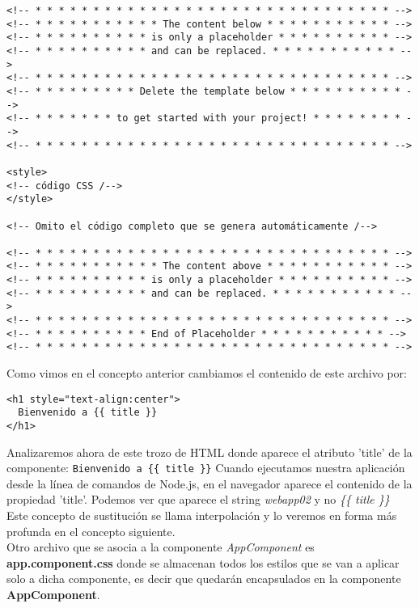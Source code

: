 \documentclass[12pt]{book} %
\begin{document}
\begin{verbatim}
<!-- * * * * * * * * * * * * * * * * * * * * * * * * * * * * * * * -->
<!-- * * * * * * * * * * * The content below * * * * * * * * * * * -->
<!-- * * * * * * * * * * is only a placeholder * * * * * * * * * * -->
<!-- * * * * * * * * * * and can be replaced. * * * * * * * * * * * -->
<!-- * * * * * * * * * * * * * * * * * * * * * * * * * * * * * * * -->
<!-- * * * * * * * * * Delete the template below * * * * * * * * * * -->
<!-- * * * * * * * to get started with your project! * * * * * * * * -->
<!-- * * * * * * * * * * * * * * * * * * * * * * * * * * * * * * * -->

<style>
<!-- código CSS /-->
</style>

<!-- Omito el código completo que se genera automáticamente /-->

<!-- * * * * * * * * * * * * * * * * * * * * * * * * * * * * * * * -->
<!-- * * * * * * * * * * * The content above * * * * * * * * * * * -->
<!-- * * * * * * * * * * is only a placeholder * * * * * * * * * * -->
<!-- * * * * * * * * * * and can be replaced. * * * * * * * * * * * -->
<!-- * * * * * * * * * * * * * * * * * * * * * * * * * * * * * * * -->
<!-- * * * * * * * * * * End of Placeholder * * * * * * * * * * * -->
<!-- * * * * * * * * * * * * * * * * * * * * * * * * * * * * * * * -->
\end{verbatim}

Como vimos en el concepto anterior cambiamos el contenido de este archivo por:

\begin{verbatim}
<h1 style="text-align:center">
  Bienvenido a {{ title }}
</h1>
\end{verbatim}

Analizaremos ahora de este trozo de HTML donde aparece el atributo 'title' de la componente: \verb_Bienvenido a {{ title }}_
Cuando ejecutamos nuestra aplicación desde la línea de comandos de Node.js, en el navegador aparece el contenido de la propiedad 'title'. Podemos ver que aparece el string \emph{webapp02} y no \emph{\{\{ title \}\}}\\

Este concepto de sustitución se llama interpolación y lo veremos en forma más profunda en el concepto siguiente.\\

Otro archivo que se asocia a la componente \emph{AppComponent} es \textbf{app.component.css} donde se almacenan todos los estilos que se van a aplicar solo a dicha componente, es decir que quedarán encapsulados en la componente \textbf{AppComponent}.\\
\end{document}

